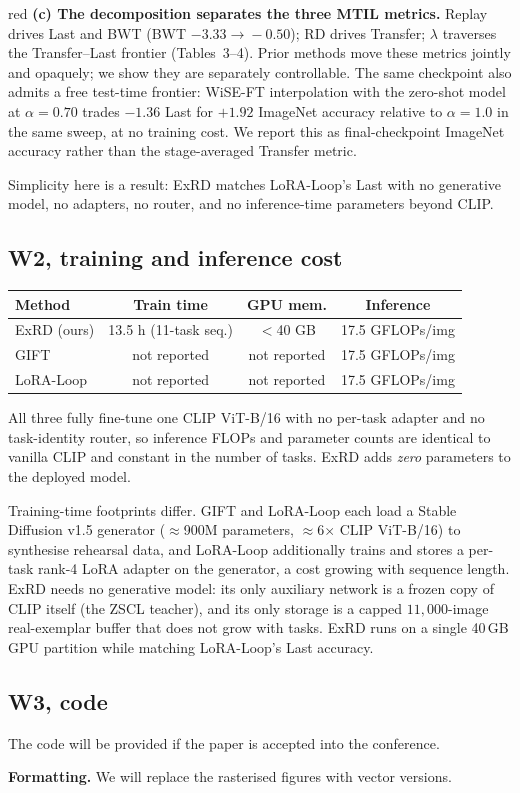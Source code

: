 \documentclass[11pt]{article}
\begin{document}
\begin{color}{red}
\textbf{(c) The decomposition separates the three MTIL metrics.} Replay drives Last and BWT (BWT $-3.33\!\to\!-0.50$); RD drives Transfer; $\lambda$ traverses the Transfer--Last frontier (Tables~3--4). Prior methods move these metrics jointly and opaquely; we show they are separately controllable. The same checkpoint also admits a free test-time frontier: WiSE-FT interpolation with the zero-shot model at $\alpha{=}0.70$ trades $-1.36$ Last for $+1.92$ ImageNet accuracy relative to $\alpha{=}1.0$ in the same sweep, at no training cost. We report this as final-checkpoint ImageNet accuracy rather than the stage-averaged Transfer metric.

Simplicity here is a result: ExRD matches LoRA-Loop's Last with no generative model, no adapters, no router, and no inference-time parameters beyond CLIP.

\subsection*{W2, training and inference cost}
\begin{table}[h]\centering\small
\begin{tabular}{lccc}
\hline
\textbf{Method} & \textbf{Train time} & \textbf{GPU mem.} & \textbf{Inference} \\
\hline
ExRD (ours) & 13.5 h (11-task seq.) & $<$40 GB & 17.5 GFLOPs/img \\
GIFT & not reported & not reported & 17.5 GFLOPs/img \\
LoRA-Loop & not reported & not reported & 17.5 GFLOPs/img \\
\hline
\end{tabular}
\end{table}

\noindent All three fully fine-tune one CLIP ViT-B/16 with no per-task adapter and no task-identity router, so inference FLOPs and parameter counts are identical to vanilla CLIP and constant in the number of tasks. ExRD adds \emph{zero} parameters to the deployed model.

Training-time footprints differ. GIFT and LoRA-Loop each load a Stable Diffusion v1.5 generator ($\approx$900M parameters, $\approx$6$\times$ CLIP ViT-B/16) to synthesise rehearsal data, and LoRA-Loop additionally trains and stores a per-task rank-4 LoRA adapter on the generator, a cost growing with sequence length. ExRD needs no generative model: its only auxiliary network is a frozen copy of CLIP itself (the ZSCL teacher), and its only storage is a capped $11{,}000$-image real-exemplar buffer that does not grow with tasks. ExRD runs on a single 40\,GB GPU partition while matching LoRA-Loop's Last accuracy.

\subsection*{W3, code}

The code will be provided if the paper is accepted into the conference.

\textbf{Formatting.} We will replace the rasterised figures with vector versions.
\end{color}
\end{document}
